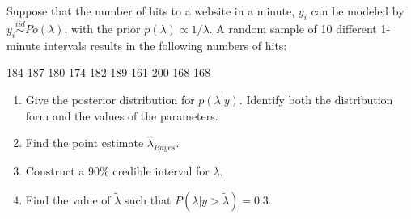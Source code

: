  \item 
    Suppose that the number of hits to a website in a minute, $y_i$ can be modeled by $y_i\stackrel{iid}{\sim}Po(\lambda)$, with the prior  $p(\lambda) \propto 1/ \lambda$. A random sample of 10 different 1-minute intervals results in the following numbers of hits: 
    
    184	187	180	174	182	189	161	200	168	168
    
    \begin{enumerate}
      \item Give the posterior distribution for $p( \lambda | y)$. Identify both the distribution form and the values of the parameters. 
      \item Find the point estimate $\hat{\lambda}_{Bayes}$. 
      \item Construct a 90\% credible interval for $\lambda$. 
      \item Find the value of $\tilde{\lambda}$ such that $P(\lambda|y>\tilde{\lambda})=0.3$.
\end{enumerate}

